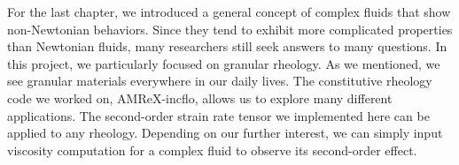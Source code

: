 For the last chapter, we introduced a general concept of complex fluids that show non-Newtonian behaviors. 
Since they tend to exhibit more complicated properties than Newtonian fluids, many researchers still seek answers to many questions. 
In this project, we particularly focused on granular rheology. As we mentioned, we see granular materials everywhere in our daily lives. 
The constitutive rheology code we worked on, AMReX-incflo, allows us to explore many different applications. 
The second-order strain rate tensor we implemented here can be applied to any rheology. 
Depending on our further interest, we can simply input viscosity computation for a complex fluid to observe its second-order effect. 
